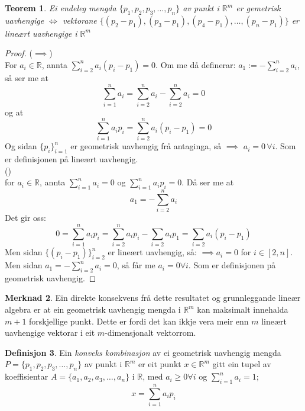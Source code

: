 \documentclass[a4paper, titlepage, 12pt, norsk]{article}
\theoremstyle{plain}
\newtheorem{theorem}{Teorem}[section]
\theoremstyle{definition}
\newtheorem{definition}[theorem]{Definisjon}
\newtheorem{remark}[theorem]{Merknad}
\newcommand{\Rb}{\mathbb{R}}
\begin{document}
\begin{theorem}\label{thm:geometrisklineærtuavhengig}
	Ei endeleg mengda $\{p_1, p_2, p_3, \dots, p_n \}$ av punkt i $\Rb^m$ er gemetrisk uavhengige $\Longleftrightarrow$ vektorane $\{(p_2-p_1), (p_3-p_1), (p_4-p_1),\dots,(p_n-p_1)\}$ er lineært uavhengige i $\Rb^m$
\end{theorem}
\begin{proof}
	($\implies$)
	\\For $a_i\in\Rb$, annta $\sum_{i=2}^na_i(p_i-p_1)=0$. Om me då definerar: $a_1 := -\sum_{i=2}^na_i$, så ser me at 
	\begin{equation*}
		\sum_{i=1}^na_i=\sum_{i=2}^na_i-\sum_{i=2}^na_i=0
	\end{equation*}
	og at 
	\begin{equation*}
		\sum_{i=1}^na_ip_i=\sum_{i=2}^na_i(p_i-p_1)=0
	\end{equation*}
	Og sidan $\{p_i\}_{i=1}^n$ er geometrisk uavhengig frå antaginga, så $\implies$ $a_i=0 \, \forall i$. Som er definisjonen på lineært uavhengig.
	\\(\Leftarrow)
	\\for $a_i\in\Rb$, annta $\sum_{i=1}^n a_i=0$ og $\sum_{i=1}^n a_ip_i=0$. Då ser me at 
	\begin{equation*}
		a_1=-\sum_{i=2}^n a_i
	\end{equation*} 
	Det gir oss: 
	\begin{equation*}
		0=\sum_{i=1}^n a_ip_i=\sum_{i=2}^n a_ip_i-\sum_{i=2}a_ip_1=\sum_{i=2}a_i(p_i-p_1)
	\end{equation*}
	Men sidan $\{(p_i-p_1)\}_{i=2}^n$ er lineært uavhengig, så: $\implies a_i = 0$ for $i\in[2,n]$. Men sidan $a_1 = -\sum_{i=2}^n a_i=0$, så får me $a_i=0 \forall i$. Som er definisjonen på geometrisk uavhengig.
\end{proof}
\begin{remark}
	Ein direkte konsekvens frå dette resultatet og grunnleggande lineær algebra er at ein geometrisk uavhengig mengda i $\Rb^m$ kan maksimalt innehalda $m+1$ forskjellige punkt. Dette er fordi det kan ikkje vera meir enn $m$ lineært uavhengige vektorar i eit $m$-dimensjonalt vektorrom.
\end{remark}
\begin{definition}
	\sloppy Ein \emph{konveks kombinasjon} av ei geometrisk uavhengig mengda $P=\{p_1, p_2, p_3, \dots, p_n\}$ av punkt i $\Rb^m$ er eit punkt $x\in\Rb^m$ gitt ein tupel av koeffisientar $A=\{a_1, a_2, a_3, \dots, a_n\}$ i $\Rb$, med $a_i\geq0\forall i$ og $\sum_{i=1}^n a_i = 1;$
	\begin{equation*}
		x=\sum_{i=1}^n a_ip_i
	\end{equation*}
\end{definition}
\end{document}
